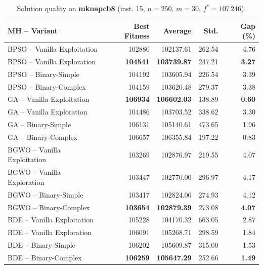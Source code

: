 \documentclass[journal,article,submit,moreauthors]{Definitions/mdpi}
\begin{document}
\begin{table}[htbp]
  \centering
  \small
  \caption{Solution quality on \textbf{mknapcb8} (inst. 15, $n=250$, $m=30$, $f^*=107\,246$).}
  \label{tab:calidad_mknapcb8_15}
  \begin{tabular}{lrrrr}
    \toprule
    \textbf{MH -- Variant} &
    \textbf{Best Fitness} &
    \textbf{Average} &
    \textbf{Std.} &
    \textbf{Gap (\%)} \\
    \midrule
    BPSO -- Vanilla Exploitation &         102880 &        102137.61 & 262.54 &         4.76 \\
    BPSO -- Vanilla Exploration  & \textbf{104541} & \textbf{103739.87} & 247.21 & \textbf{3.27} \\
    BPSO -- Binary-Simple        &         104192 &        103605.94 & 226.54 &         3.39 \\
    BPSO -- Binary-Complex       &         104159 &        103620.48 & 279.37 &         3.38 \\
    \midrule
    GA -- Vanilla Exploitation   & \textbf{106934} & \textbf{106602.03} & 138.89 & \textbf{0.60} \\
    GA -- Vanilla Exploration    &         104486 &        103703.52 & 338.62 &         3.30 \\
    GA -- Binary-Simple          &         106131 &        105140.61 & 473.65 &         1.96 \\
    GA -- Binary-Complex         &         106657 &        106355.84 & 197.22 &         0.83 \\
    \midrule
    BGWO -- Vanilla Exploitation &         103269 &        102876.97 & 219.55 &         4.07 \\
    BGWO -- Vanilla Exploration  &         103447 &        102770.00 & 296.97 &         4.17 \\
    BGWO -- Binary-Simple        &         103417 &        102824.06 & 274.93 &         4.12 \\
    BGWO -- Binary-Complex       & \textbf{103654} & \textbf{102879.39} & 273.08 & \textbf{4.07} \\
    \midrule
    BDE -- Vanilla Exploitation  &         105228 &        104170.32 & 663.05 &         2.87 \\
    BDE -- Vanilla Exploration   &         106091 &        105268.71 & 298.59 &         1.84 \\
    BDE -- Binary-Simple         &         106202 &        105609.87 & 315.00 &         1.53 \\
    BDE -- Binary-Complex        & \textbf{106259} & \textbf{105647.29} & 252.66 & \textbf{1.49} \\
    \bottomrule
  \end{tabular}
\end{table}
\end{document}
